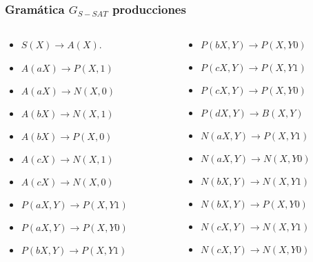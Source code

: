 \documentclass{beamer}
\begin{document}
\begin{frame}
    \frametitle{Gramática $G_{S-SAT}$ producciones}
    
    \begin{columns}
        \begin{column}{0.48\textwidth}
            \begin{itemize}
                \item $S(X)\to A(X)$.
                      
                \item $A(aX)\to P(X,1)$
                \item $A(aX)\to N(X,0)$
                \item $A(bX)\to N(X,1)$
                \item $A(bX)\to P(X,0)$
                \item $A(cX)\to N(X,1)$
                \item $A(cX)\to N(X,0)$
                      
                \item $P(aX,Y)\to P(X,Y1)$
                \item $P(aX,Y)\to P(X,Y0)$
                \item $P(bX,Y)\to P(X,Y1)$
            \end{itemize}
        \end{column}
        \begin{column}{0.48\textwidth}
            \begin{itemize}
                \item $P(bX,Y)\to P(X,Y0)$
                      
                \item $P(cX,Y)\to P(X,Y1)$
                \item $P(cX,Y)\to P(X,Y0)$
                \item $P(dX,Y)\to B(X,Y)$
                      
                \item $N(aX,Y)\to P(X,Y1)$
                \item $N(aX,Y)\to N(X,Y0)$
                \item $N(bX,Y)\to N(X,Y1)$
                \item $N(bX,Y)\to P(X,Y0)$
                \item $N(cX,Y)\to N(X,Y1)$
                \item $N(cX,Y)\to N(X,Y0)$
            \end{itemize}
        \end{column}
        
    \end{columns}
\end{frame}
\end{document}
